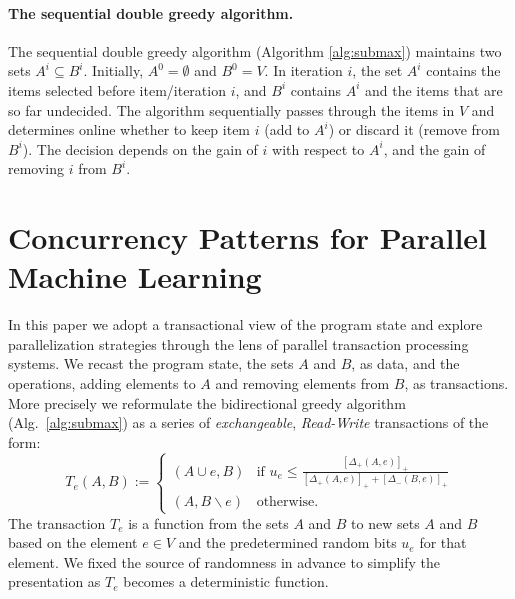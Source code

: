 \documentclass{article} %
\newcommand{\algref}[1]{Alg.~\ref{#1}}
\newcommand{\hinge}[1]{\left[  #1 \right]_+}
\newcommand{\union}{\cup}
\begin{document}
\paragraph{The sequential double greedy algorithm.}
The sequential double greedy algorithm (Algorithm \ref{alg:submax}) maintains two sets $A^i \subseteq B^i$. Initially, $A^0 = \emptyset$ and $B^0 = V$. In iteration $i$, the set $A^i$ contains the items selected before item/iteration $i$, and $B^i$ contains $A^i$ and the items that are so far undecided. The algorithm sequentially passes through the items in $V$ and determines online whether to keep item $i$ (add to $A^i$) or discard it (remove from $B^i$). The decision depends on the gain of $i$ with respect to $A^i$, and the gain of removing $i$ from $B^i$.










\section{Concurrency Patterns for Parallel Machine Learning}

In this paper we adopt a transactional view of the program state and explore parallelization strategies through the lens of parallel transaction processing systems.
We recast the program state, the sets $A$ and $B$, as data, and the operations, adding elements to $A$ and removing elements from $B$, as transactions.
More precisely we reformulate the bidirectional greedy algorithm (\algref{alg:submax}) as a series of \emph{exchangeable}, \emph{Read-Write} transactions of the form:
\begin{equation}
T_e(A,B) :=
\begin{cases}
   (A \union e, B) & \text{if } u_e \leq \frac{\hinge{\Delta_+(A,e)}}{ \hinge{\Delta_+(A,e)} + \hinge{\Delta_-(B,e)}}  \\
   (A, B \backslash e) & \text{otherwise. }
  \end{cases}
  \label{eqn:greedytransaction}
\end{equation}
The transaction $T_e$ is a function from the sets $A$ and $B$ to new sets $A$ and $B$ based on the element $e \in V$ and the predetermined random bits $u_e$ for that element.
We fixed the source of randomness in advance to simplify the presentation as $T_e$ becomes a deterministic function.
\end{document}

